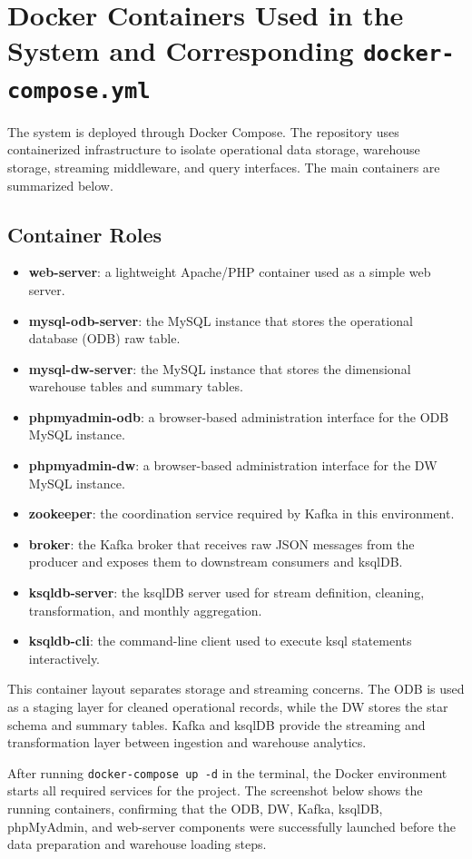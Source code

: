 \documentclass[11pt]{article}
\begin{document}
\section{Docker Containers Used in the System and Corresponding \texttt{docker-compose.yml}}
The system is deployed through Docker Compose. The repository uses containerized infrastructure to isolate operational data storage, warehouse storage, streaming middleware, and query interfaces. The main containers are summarized below.

\subsection{Container Roles}
\begin{itemize}
    \item \textbf{web-server}: a lightweight Apache/PHP container used as a simple web server.
    \item \textbf{mysql-odb-server}: the MySQL instance that stores the operational database (ODB) raw table.
    \item \textbf{mysql-dw-server}: the MySQL instance that stores the dimensional warehouse tables and summary tables.
    \item \textbf{phpmyadmin-odb}: a browser-based administration interface for the ODB MySQL instance.
    \item \textbf{phpmyadmin-dw}: a browser-based administration interface for the DW MySQL instance.
    \item \textbf{zookeeper}: the coordination service required by Kafka in this environment.
    \item \textbf{broker}: the Kafka broker that receives raw JSON messages from the producer and exposes them to downstream consumers and ksqlDB.
    \item \textbf{ksqldb-server}: the ksqlDB server used for stream definition, cleaning, transformation, and monthly aggregation.
    \item \textbf{ksqldb-cli}: the command-line client used to execute ksql statements interactively.
\end{itemize}

This container layout separates storage and streaming concerns. The ODB is used as a staging layer for cleaned operational records, while the DW stores the star schema and summary tables. Kafka and ksqlDB provide the streaming and transformation layer between ingestion and warehouse analytics.

After running \texttt{docker-compose up -d} in the terminal, the Docker environment starts all required services for the project. The screenshot below shows the running containers, confirming that the ODB, DW, Kafka, ksqlDB, phpMyAdmin, and web-server components were successfully launched before the data preparation and warehouse loading steps.
\end{document}
